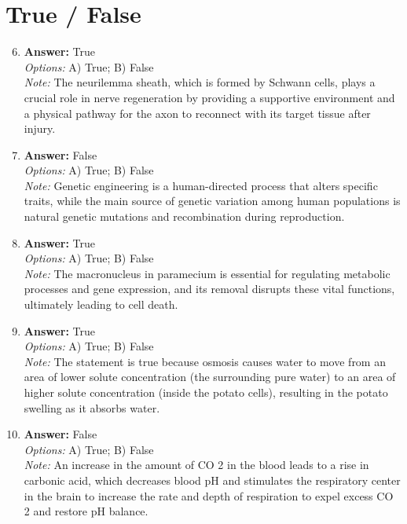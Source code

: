 \documentclass[12pt]{article}
\begin{document}
\section*{True / False}
\begin{enumerate}[label=\arabic*.]
\setcounter{enumi}{5}
\item \textbf{Answer:} True
\\ \textit{Options:} A) True; B) False
\\ \textit{Note:} The neurilemma sheath, which is formed by Schwann cells, plays a crucial role in nerve regeneration by providing a supportive environment and a physical pathway for the axon to reconnect with its target tissue after injury.
\item \textbf{Answer:} False
\\ \textit{Options:} A) True; B) False
\\ \textit{Note:} Genetic engineering is a human-directed process that alters specific traits, while the main source of genetic variation among human populations is natural genetic mutations and recombination during reproduction.
\item \textbf{Answer:} True
\\ \textit{Options:} A) True; B) False
\\ \textit{Note:} The macronucleus in paramecium is essential for regulating metabolic processes and gene expression, and its removal disrupts these vital functions, ultimately leading to cell death.
\item \textbf{Answer:} True
\\ \textit{Options:} A) True; B) False
\\ \textit{Note:} The statement is true because osmosis causes water to move from an area of lower solute concentration (the surrounding pure water) to an area of higher solute concentration (inside the potato cells), resulting in the potato swelling as it absorbs water.
\item \textbf{Answer:} False
\\ \textit{Options:} A) True; B) False
\\ \textit{Note:} An increase in the amount of CO 2 in the blood leads to a rise in carbonic acid, which decreases blood pH and stimulates the respiratory center in the brain to increase the rate and depth of respiration to expel excess CO 2 and restore pH balance.
\end{enumerate}
\end{document}
